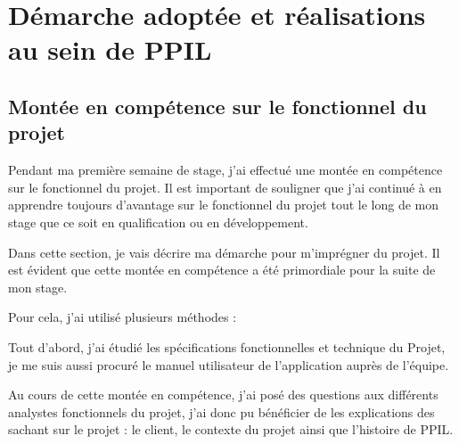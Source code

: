 \chapter{Démarche adoptée et réalisations au sein de PPIL}
\label{chap:premierchapitre}


\section{Montée en compétence sur le fonctionnel du projet}

Pendant ma première semaine de stage, j'ai effectué une montée en compétence sur le fonctionnel du projet. Il est important de souligner que j'ai continué à en apprendre toujours d'avantage sur le fonctionnel du projet tout le long de mon stage que ce soit en qualification ou en développement.

Dans cette section, je vais décrire ma démarche pour m'imprégner du projet. Il est évident que cette montée en compétence a été primordiale pour la suite de mon stage.

Pour cela, j'ai utilisé plusieurs méthodes :

Tout d'abord, j'ai étudié les spécifications fonctionnelles et technique du Projet, je me suis aussi procuré le manuel utilisateur de l'application auprès de l'équipe.

Au cours de cette montée en compétence, j'ai posé des questions aux différents analystes fonctionnels du projet, j'ai donc pu bénéficier de les explications des sachant sur le projet : le client, le contexte du projet ainsi que l'histoire de PPIL. 

